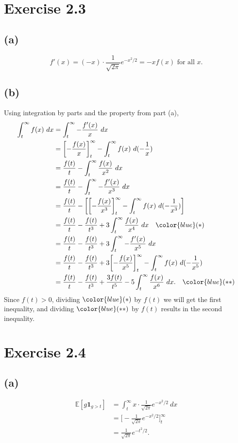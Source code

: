 \newpage
\section*{Exercise 2.3}
\subsection*{(a)}
\[ f'(x) = (-x) \cdot \frac{1}{\sqrt{2 \pi}} e^{-x^2 / 2} = -xf(x) \text{ for all } x. \]

\subsection*{(b)}
Using integration by parts and the property from part (a), 
\begin{align*}
	\int_{t}^{\infty} f(x) \ dx
	&= \int_{t}^{\infty} -\frac{f'(x)}{x} \ dx \\
	&= \biggl[ -\frac{f(x)}{x} \biggr]_t^{\infty} - \int_{t}^{\infty} f(x) \ d(-\frac{1}{x}) \\
	&= \frac{f(t)}{t} - \int_{t}^{\infty} \frac{f(x)}{x^2} \ dx \\
	&= \frac{f(t)}{t} - \int_{t}^{\infty} -\frac{f'(x)}{x^3} \ dx \\
	&= \frac{f(t)}{t} - \biggl[ \biggl[ -\frac{f(x)}{x^3} \biggr]_t^\infty 
	- \int_{t}^{\infty} f(x) \ d(-\frac{1}{x^3}) \biggr] \\
	&= \frac{f(t)}{t} - \frac{f(t)}{t^3} + 3 \int_{t}^{\infty} \frac{f(x)}{x^4} \ dx \quad 
	{\color{blue} (*)} \\
	&= \frac{f(t)}{t} - \frac{f(t)}{t^3} + 3 \int_{t}^{\infty} -\frac{f'(x)}{x^5} \ dx \\
	&= \frac{f(t)}{t} - \frac{f(t)}{t^3} + 3 \biggl[ -\frac{f(x)}{x^5} \biggr]_t^\infty 
	- \int_{t}^{\infty} f(x) \ d(-\frac{1}{x^5}) \\
	&= \frac{f(t)}{t} - \frac{f(t)}{t^3} + \frac{3f(t)}{t^5} - 5 \int_{t}^{\infty} \frac{f(x)}{x^6} \ dx 
	. \quad {\color{blue} (**)}
\end{align*}
Since $f(t) > 0$, dividing $\color{blue} (*)$ by $f(t)$ we will get the first inequality, and dividing 
$\color{blue} (**)$ by $f(t)$ results in the second inequality.


\newpage
\section*{Exercise 2.4}
\subsection*{(a)}
\begin{align*}
	\mathbb{E}[g \mathbf{1}_{g > t}] 
	&= \int_{t}^{\infty} x \cdot \frac{1}{\sqrt{2 \pi}} e^{-x^2 / 2} \ dx \\
	&= \biggl[ -\frac{1}{\sqrt{2 \pi}} e^{-x^2 / 2} \biggr]_t^\infty \\
	&= \frac{1}{\sqrt{2 \pi}} e^{-t^2 / 2}.
\end{align*}

